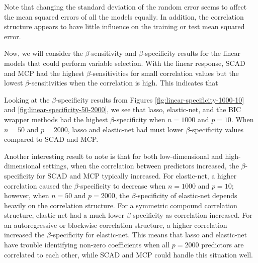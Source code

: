 \documentclass{article}
\begin{document}

	
	Note that changing the standard deviation of the random error seems to affect the mean squared errors of all the models equally. In addition, the correlation structure appears to have little influence on the training or test mean squared error.
	
	Now, we will consider the $\beta$-sensitivity and $\beta$-specificity results for the linear models that could perform variable selection. With the linear response, SCAD and MCP had the highest $\beta$-sensitivities for small correlation values but the lowest $\beta$-sensitivities when the correlation is high. This indicates that 
	
	Looking at the $\beta$-specificity results from Figures \ref{fig:linear-specificity-1000-10} and \ref{fig:linear-specificity-50-2000}, we see that lasso, elastic-net, and the BIC wrapper methods had the highest $\beta$-specificity when $n = 1000$ and $p = 10$. When $n = 50$ and $p = 2000$, lasso and elastic-net had must lower $\beta$-specificity values compared to SCAD and MCP.
	
	Another interesting result to note is that for both low-dimensional and high-dimensional settings, when the correlation between predictors increased, the $\beta$-specificity for SCAD and MCP typically increased. For elastic-net, a higher correlation caused the $\beta$-specificity to decrease when $n = 1000$ and $p = 10$; however, when $n = 50$ and $p = 2000$, the $\beta$-specificity of elastic-net depends heavily on the correlation structure. For a symmetric compound correlation structure, elastic-net had a much lower $\beta$-specificity as correlation increased. For an autoregressive or blockwise correlation structure, a higher correlation increased the $\beta$-specificity for elastic-net. This means that lasso and elastic-net have trouble identifying non-zero coefficients when all $p = 2000$ predictors are correlated to each other, while SCAD and MCP could handle this situation well.
	
\end{document}
